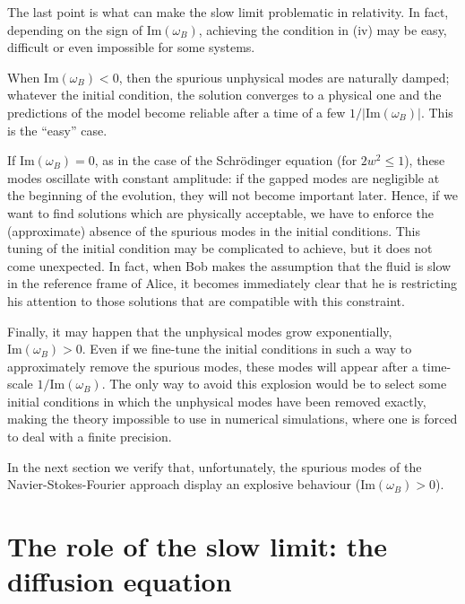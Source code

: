 \documentclass[a4paper, amsfonts, amssymb, amsmath, reprint, twocolumn, showkeys, nofootinbib]{revtex4-2}
\begin{document}
The last point is what can make the slow limit problematic in relativity. In fact, depending on the sign of $\text{Im}(\omega_B)$, achieving the condition in (iv) may be easy, difficult or even impossible for some systems.

When $\text{Im}(\omega_B) <0 $,
then the spurious unphysical modes are naturally damped; whatever the initial condition, the solution converges to a physical one and the predictions of the model become reliable after a time of a few $1/|\text{Im}(\omega_B)|$. This is the ``easy'' case.

If $\text{Im}(\omega_B) = 0 $,
as in the case of the Schr\"{o}dinger equation (for $2w^2 \leq 1$), these modes oscillate with constant amplitude: if the gapped modes are negligible at the beginning of the evolution, they will not become important later. Hence, if we want to find solutions which are physically acceptable, we have to enforce the (approximate) absence of the spurious modes in the initial conditions.  This tuning of the initial condition may be complicated to achieve, but it does not come unexpected. In fact, when Bob makes the assumption that the fluid is slow in the reference frame of Alice, it becomes immediately clear that he is restricting his attention to those solutions that are compatible with this constraint.

Finally, it may happen that the unphysical modes grow exponentially,
$ \text{Im}(\omega_B) >0 $. %
Even if we fine-tune the initial conditions in such a way to approximately remove the spurious modes, these modes will appear after a time-scale $1/\text{Im}(\omega_B)$. 
The only way to avoid this explosion would be to select some initial conditions in which the unphysical modes have been  removed exactly, making the theory impossible to use in numerical simulations, where one is forced to deal with a finite precision.

In the next section we verify that, unfortunately, the spurious modes of the  Navier-Stokes-Fourier approach display an explosive behaviour ($ \text{Im}(\omega_B) >0 $).

\section{The role of the slow limit: the diffusion equation}\label{RadiatttT}
\end{document}
